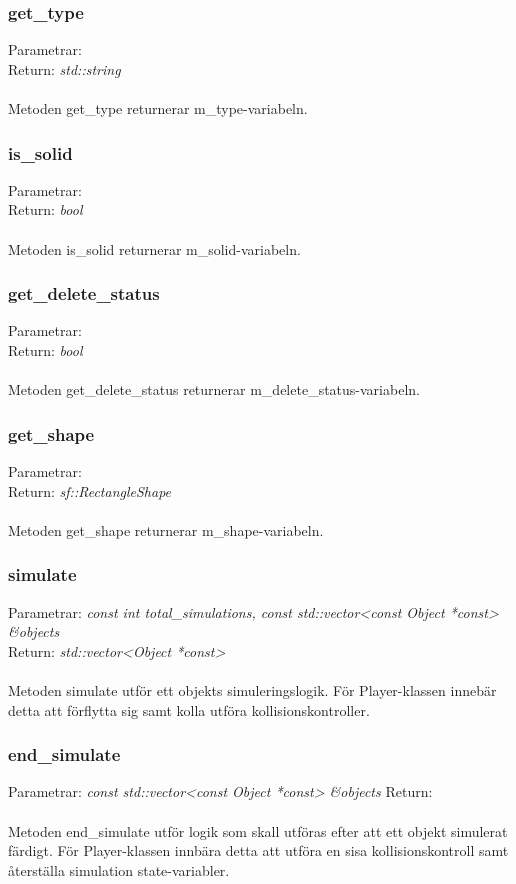 \documentclass{TDP003mall}
\begin{document}
 \subsubsection{get\_type}
Parametrar: \textit{}
\\Return: \textit{std::string}
\\\\
Metoden get\_type returnerar m\_type-variabeln.

 \subsubsection{is\_solid}
Parametrar: \textit{}
\\Return: \textit{bool}
\\\\
Metoden is\_solid returnerar m\_solid-variabeln.

 \subsubsection{get\_delete\_status}
Parametrar: \textit{}
\\Return: \textit{bool}
\\\\
Metoden get\_delete\_status returnerar m\_delete\_status-variabeln.

 \subsubsection{get\_shape}
Parametrar: \textit{}
\\Return: \textit{sf::RectangleShape}
\\\\
Metoden get\_shape returnerar m\_shape-variabeln.

 \subsubsection{simulate}
Parametrar: \textit{const int total\_simulations, const std::vector<const Object *const> \&objects}
\\Return: \textit{std::vector<Object *const>}
\\\\
Metoden simulate utför ett objekts simuleringslogik. För Player-klassen innebär detta att förflytta sig samt kolla utföra kollisionskontroller.

 \subsubsection{end\_simulate}
Parametrar: \textit{const std::vector<const Object *const> \&objects}
Return:
\\\\
Metoden end\_simulate utför logik som skall utföras efter att ett objekt simulerat färdigt. För Player-klassen innbära detta att utföra en sisa kollisionskontroll samt återställa simulation state-variabler.
\end{document}
